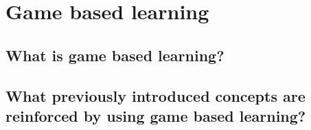\chapter{Game based learning}



\section{What is game based learning?}

\section{What previously introduced concepts are reinforced by using game based learning?}